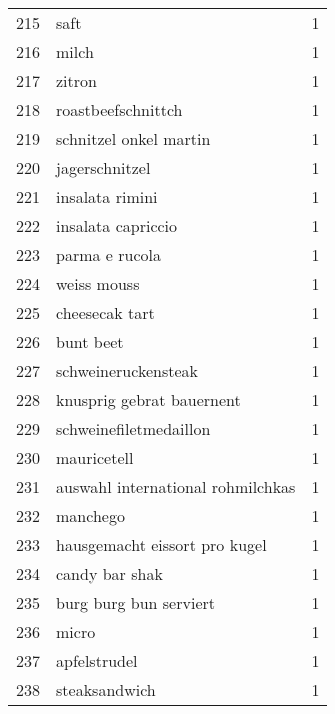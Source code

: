 \begin{tabular}{llr}
215 &                                               saft &      1 \\
216 &                                              milch &      1 \\
217 &                                             zitron &      1 \\
218 &                                 roastbeefschnittch &      1 \\
219 &                             schnitzel onkel martin &      1 \\
220 &                                     jagerschnitzel &      1 \\
221 &                                    insalata rimini &      1 \\
222 &                                 insalata capriccio &      1 \\
223 &                                     parma e rucola &      1 \\
224 &                                        weiss mouss &      1 \\
225 &                                     cheesecak tart &      1 \\
226 &                                          bunt beet &      1 \\
227 &                                schweineruckensteak &      1 \\
228 &                          knusprig gebrat bauernent &      1 \\
229 &                             schweinefiletmedaillon &      1 \\
230 &                                        mauricetell &      1 \\
231 &                  auswahl international rohmilchkas &      1 \\
232 &                                           manchego &      1 \\
233 &                      hausgemacht eissort pro kugel &      1 \\
234 &                                     candy bar shak &      1 \\
235 &                             burg burg bun serviert &      1 \\
236 &                                              micro &      1 \\
237 &                                       apfelstrudel &      1 \\
238 &                                      steaksandwich &      1 \\

\end{tabular}
